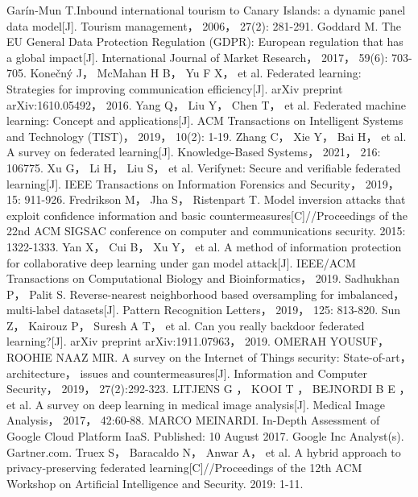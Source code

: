 \documentclass[12pt,openany,a4paper,fancyhdr,oneside]{ctexbook}
\begin{document}
\begin{thebibliography}{99}

Garín-Mun T.Inbound international tourism to Canary Islands: a dynamic panel data model[J]. Tourism management， 2006， 27(2): 281-291.
Goddard M. The EU General Data Protection Regulation (GDPR): European regulation that has a global impact[J]. International Journal of Market Research， 2017， 59(6): 703-705.
Konečný J， McMahan H B， Yu F X， et al. Federated learning: Strategies for improving communication efficiency[J]. arXiv preprint arXiv:1610.05492， 2016.
Yang Q， Liu Y， Chen T， et al. Federated machine learning: Concept and applications[J]. ACM Transactions on Intelligent Systems and Technology (TIST)， 2019， 10(2): 1-19.
Zhang C， Xie Y， Bai H， et al. A survey on federated learning[J]. Knowledge-Based Systems， 2021， 216: 106775.
Xu G， Li H， Liu S， et al. Verifynet: Secure and verifiable federated learning[J]. IEEE Transactions on Information Forensics and Security， 2019， 15: 911-926.
Fredrikson M， Jha S， Ristenpart T. Model inversion attacks that exploit confidence information and basic countermeasures[C]//Proceedings of the 22nd ACM SIGSAC conference on computer and communications security. 2015: 1322-1333.
Yan X， Cui B， Xu Y， et al. A method of information protection for collaborative deep learning under gan model attack[J]. IEEE/ACM Transactions on Computational Biology and Bioinformatics， 2019.
Sadhukhan P， Palit S. Reverse-nearest neighborhood based oversampling for imbalanced， multi-label datasets[J]. Pattern Recognition Letters， 2019， 125: 813-820.
Sun Z， Kairouz P， Suresh A T， et al. Can you really backdoor federated learning?[J]. arXiv preprint arXiv:1911.07963， 2019.
OMERAH  YOUSUF，  ROOHIE  NAAZ  MIR.  A  survey  on  the  Internet  of  Things 
security:  State-of-art，  architecture，  issues  and  countermeasures[J].  Information  and 
Computer Security， 2019， 27(2):292-323. 
LITJENS G ， KOOI T ， BEJNORDI B E ， et al. A survey on deep learning in medical 
image analysis[J]. Medical Image Analysis， 2017， 42:60-88. 
MARCO MEINARDI. In-Depth Assessment of Google Cloud Platform IaaS. Published: 
10 August 2017. Google Inc Analyst(s). Gartner.com.
Truex S， Baracaldo N， Anwar A， et al. A hybrid approach to privacy-preserving federated learning[C]//Proceedings of the 12th ACM Workshop on Artificial Intelligence and Security. 2019: 1-11.

\end{thebibliography}
\end{document}
